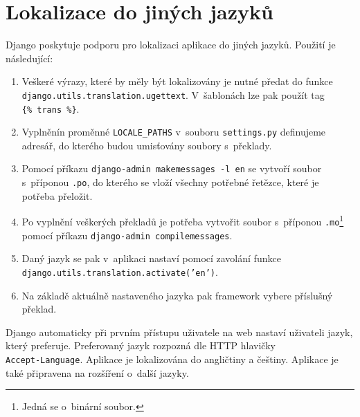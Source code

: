 \section{Lokalizace do jiných jazyků}
Django poskytuje podporu pro lokalizaci aplikace do jiných jazyků. Použití je následující:
\begin{enumerate}
    \item Veškeré výrazy, které by měly být lokalizovány je nutné předat do funkce \\\texttt{django.utils.translation.ugettext}. V~šablonách lze pak použít tag \\\mbox{\texttt{\{\% trans \%\}}}.
    \item Vyplněnín proměnné \texttt{LOCALE\_PATHS} v~souboru \texttt{settings.py} definujeme adresář, do kterého budou umisťovány soubory s~překlady.
    \item Pomocí příkazu \texttt{django-admin makemessages -l en} se vytvoří soubor s~příponou \texttt{.po}, do kterého se vloží všechny potřebné řetězce, které je potřeba přeložit.
    \item Po vyplnění veškerých překladů je potřeba vytvořit soubor s~příponou \texttt{.mo}\footnote{Jedná se o~binární soubor.} pomocí příkazu \texttt{django-admin compilemessages}.
    \item Daný jazyk se pak v~aplikaci nastaví pomocí zavolání funkce \\\texttt{django.utils.translation.activate('en')}.
    \item Na základě aktuálně nastaveného jazyka pak framework vybere příslušný překlad.
\end{enumerate}

Django automaticky při prvním přístupu uživatele na web nastaví uživateli jazyk, který preferuje. Preferovaný jazyk rozpozná dle HTTP hlavičky \\\texttt{Accept-Language}. Aplikace je lokalizována do angličtiny a češtiny. Aplikace je také připravena na rozšíření o~další jazyky.